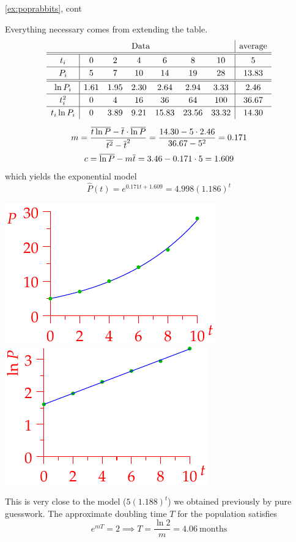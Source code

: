 \begin{example*}{\ref{ex:poprabbits}, cont}{}
		\begin{minipage}[t]{0.64\linewidth}\vspace{0pt}
			Everything necessary comes from extending the table.
			\begin{gather*}\def\arraystretch{1.2}
				\begin{array}{c|cccccc|c}
					\multicolumn{7}{c|}{\text{Data}}&\text{average}\\\hline\hline
					t_i&0&2&4&6&8&10&5\\\hline
					P_i&5&7&10&14&19&28&13.83\\\hline\hline
					\ln P_i&1.61&1.95&2.30&2.64&2.94&3.33&2.46\\\hline
					t_i^2&0&4&16&36&64&100&36.67\\\hline
					t_i\ln P_i&0&3.89&9.21&15.83&23.56&33.32&14.30
				\end{array}\\[5pt]
				m=\frac{\cl{t\ln P}-\cl t\cdot\cl{\ln P}}{\cl{t^2}-\cl t^2}=\frac{14.30-5\cdot 2.46}{36.67-5^2} =0.171\\[2pt]
				c=\cl{\ln P}-m\cl t=3.46-0.171\cdot 5=1.609
			\end{gather*}
			which yields the exponential model
			\[
				\hat P(t)=e^{0.171t+1.609}=4.998(1.186)^t
			\]
		\end{minipage}
		\hfill
		\begin{minipage}[t]{0.35\linewidth}\vspace{0pt}
			\flushright\includegraphics{rabbits5}\\
			\includegraphics{rabbits6}
	\end{minipage}\medbreak
	
	This is very close to the model ($5(1.188)^t$) we obtained previously by pure guesswork. The approximate doubling time $T$ for the population satisfies
	\[
		e^{mT}=2\implies T=\frac{\ln 2}{m}=4.06\ \text{months}
	\]
\end{example*}

